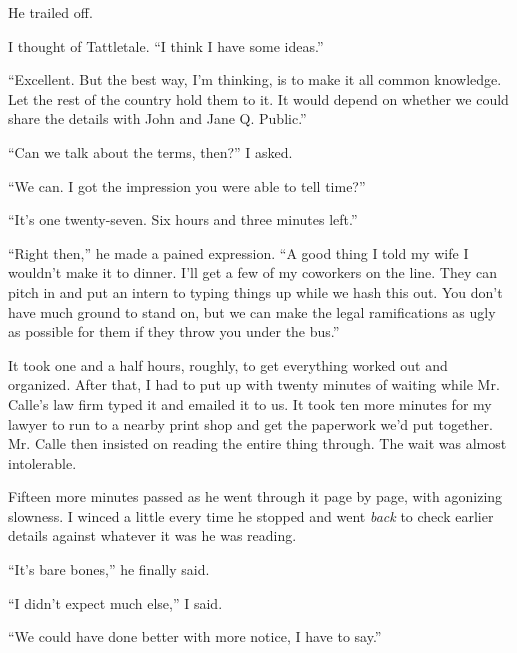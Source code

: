 He trailed off.



I thought of Tattletale.  ``I think I have some ideas.''



``Excellent.  But the best way, I'm thinking, is to make it all common knowledge.  Let the rest of the country hold them to it.  It would depend on whether we could share the details with John and Jane Q. Public.''



``Can we talk about the terms, then?'' I asked.



``We can.  I got the impression you were able to tell time?''



``It's one twenty-seven.  Six hours and three minutes left.''



``Right then,'' he made a pained expression.  ``A good thing I told my wife I wouldn't make it to dinner.  I'll get a few of my coworkers on the line.  They can pitch in and put an intern to typing things up while we hash this out.  You don't have much ground to stand on, but we can make the legal ramifications as ugly as possible for them if they throw you under the bus.''



\blacksquare



It took one and a half hours, roughly, to get everything worked out and organized.  After that, I had to put up with twenty minutes of waiting while Mr. Calle's law firm typed it and emailed it to us.  It took ten more minutes for my lawyer to run to a nearby print shop and get the paperwork we'd put together.  Mr. Calle then insisted on reading the entire thing through.  The wait was almost intolerable.



Fifteen more minutes passed as he went through it page by page, with agonizing slowness.  I winced a little every time he stopped and went \emph{back} to check earlier details against whatever it was he was reading.



``It's bare bones,'' he finally said.



``I didn't expect much else,'' I said.



``We could have done better with more notice, I have to say.''



